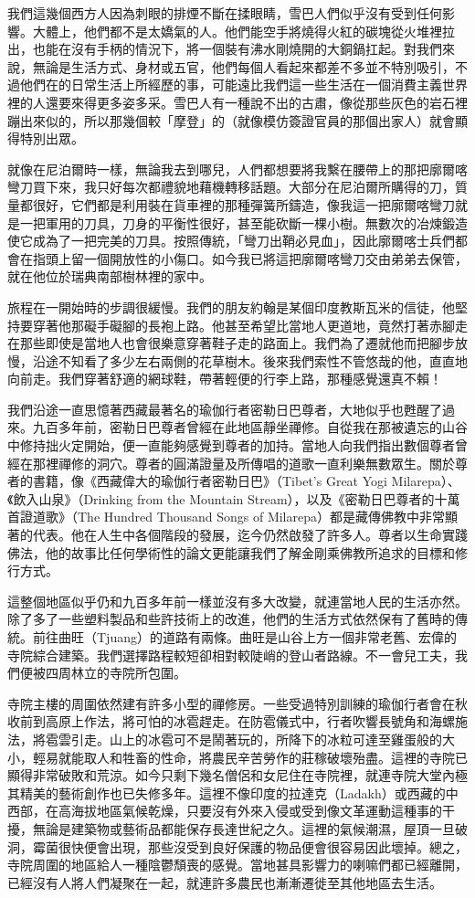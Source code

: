 我們這幾個西方人因為刺眼的排煙不斷在揉眼睛，雪巴人們似乎沒有受到任何影響。大體上，他們都不是太嬌氣的人。他們能空手將燒得火紅的碳塊從火堆裡拉出，也能在沒有手柄的情況下，將一個裝有沸水剛燒開的大銅鍋扛起。對我們來說，無論是生活方式、身材或五官，他們每個人看起來都差不多並不特別吸引，不過他們在的日常生活上所經歷的事，可能遠比我們這一些生活在一個消費主義世界裡的人還要來得更多姿多采。雪巴人有一種說不出的古肅，像從那些灰色的岩石裡蹦出來似的，所以那幾個較「摩登」的（就像模仿簽證官員的那個出家人）就會顯得特別出眾。

就像在尼泊爾時一樣，無論我去到哪兒，人們都想要將我繫在腰帶上的那把廓爾喀彎刀買下來，我只好每次都禮貌地藉機轉移話題。大部分在尼泊爾所購得的刀，質量都很好，它們都是利用裝在貨車裡的那種彈簧所鑄造，像我這一把廓爾喀彎刀就是一把軍用的刀具，刀身的平衡性很好，甚至能砍斷一棵小樹。無數次的冶煉鍛造使它成為了一把完美的刀具。按照傳統，「彎刀出鞘必見血」，因此廓爾喀士兵們都會在指頭上留一個開放性的小傷口。如今我已將這把廓爾喀彎刀交由弟弟去保管，就在他位於瑞典南部樹林裡的家中。

旅程在一開始時的步調很緩慢。我們的朋友約翰是某個印度教斯瓦米的信徒，他堅持要穿著他那礙手礙腳的長袍上路。他甚至希望比當地人更道地，竟然打著赤腳走在那些即使是當地人也會很樂意穿著鞋子走的路面上。我們為了遷就他而把腳步放慢，沿途不知看了多少左右兩側的花草樹木。後來我們索性不管悠哉的他，直直地向前走。我們穿著舒適的網球鞋，帶著輕便的行李上路，那種感覺還真不賴！

我們沿途一直思憶著西藏最著名的瑜伽行者密勒日巴尊者，大地似乎也甦醒了過來。九百多年前，密勒日巴尊者曾經在此地區靜坐禪修。自從我在那被遺忘的山谷中修持拙火定開始，便一直能夠感覺到尊者的加持。當地人向我們指出數個尊者曾經在那裡禪修的洞穴。尊者的圓滿證量及所傳唱的道歌一直利樂無數眾生。關於尊者的書籍，像《西藏偉大的瑜伽行者密勒日巴》（Tibet's
Great Yogi Milarepa）、《飲入山泉》（Drinking from the Mountain
Stream），以及《密勒日巴尊者的十萬首證道歌》（The Hundred Thousand Songs
of
Milarepa）都是藏傳佛教中非常顯著的代表。他在人生中各個階段的發展，迄今仍然啟發了許多人。尊者以生命實踐佛法，他的故事比任何學術性的論文更能讓我們了解金剛乘佛教所追求的目標和修行方式。

這整個地區似乎仍和九百多年前一樣並沒有多大改變，就連當地人民的生活亦然。除了多了一些塑料製品和些許技術上的改進，他們的生活方式依然保有了舊時的傳統。前往曲旺（Tjuang）的道路有兩條。曲旺是山谷上方一個非常老舊、宏偉的寺院綜合建築。我們選擇路程較短卻相對較陡峭的登山者路線。不一會兒工夫，我們便被四周林立的寺院所包圍。

寺院主樓的周圍依然建有許多小型的禪修房。一些受過特別訓練的瑜伽行者會在秋收前到高原上作法，將可怕的冰雹趕走。在防雹儀式中，行者吹響長號角和海螺施法，將雹雲引走。山上的冰雹可不是鬧著玩的，所降下的冰粒可達至雞蛋般的大小，輕易就能取人和牲畜的性命，將農民辛苦勞作的莊稼破壞殆盡。這裡的寺院已顯得非常破敗和荒涼。如今只剩下幾名僧侶和女尼住在寺院裡，就連寺院大堂內極其精美的藝術創作也已失修多年。這裡不像印度的拉達克（Ladakh）或西藏的中西部，在高海拔地區氣候乾燥，只要沒有外來入侵或受到像文革運動這種事的干擾，無論是建築物或藝術品都能保存長達世紀之久。這裡的氣候潮濕，屋頂一旦破洞，霉菌很快便會出現，那些沒受到良好保護的物品便會很容易因此壞掉。總之，寺院周圍的地區給人一種陰鬱頹喪的感覺。當地甚具影響力的喇嘛們都已經離開，已經沒有人將人們凝聚在一起，就連許多農民也漸漸遷徙至其他地區去生活。

